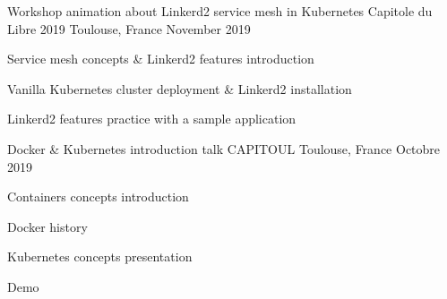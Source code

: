 

\begin{cventries}

  \cventry
    {Workshop animation about Linkerd2 service mesh in Kubernetes} %
    {Capitole du Libre 2019} %
    {Toulouse, France} %
    {November 2019} %
    {
      \begin{cvitems} %
        \item {Service mesh concepts \& Linkerd2 features introduction}
        \item {Vanilla Kubernetes cluster deployment \& Linkerd2 installation}
        \item {Linkerd2 features practice with a sample application}
      \end{cvitems}
    }

  \cventry
    {Docker \& Kubernetes introduction talk} %
    {CAPITOUL} %
    {Toulouse, France} %
    {Octobre 2019} %
    {
      \begin{cvitems} %
        \item {Containers concepts introduction}
        \item {Docker history}
        \item {Kubernetes concepts presentation}
        \item {Demo}
      \end{cvitems}
    }

\end{cventries}
